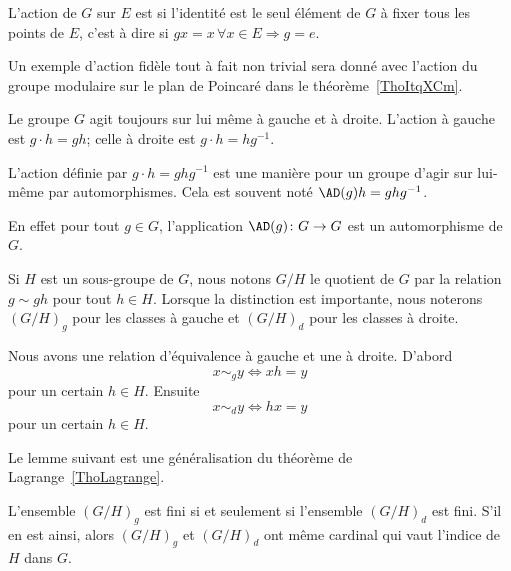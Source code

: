 \begin{definition}  \label{DefuyYJRh}
    L'action de \( G\) sur \( E\) est  si l'identité est le seul élément de \( G\) à fixer tous les points de \( E\), c'est à dire si \( gx=x\,\forall x\in E\Rightarrow g=e\).
\end{definition}

Un exemple d'action fidèle tout à fait non trivial sera donné avec l'action du groupe modulaire sur le plan de Poincaré dans le théorème~\ref{ThoItqXCm}.

Le groupe \( G\) agit toujours sur lui même à gauche et à droite. L'action à gauche est \( g\cdot h=gh\); celle à droite est \( g\cdot h=hg^{-1}\).

\begin{definition}      \label{DEFooCORTooEeOLPT}
    L'action  définie par \( g\cdot h=ghg^{-1}\) est une manière pour un groupe d'agir sur lui-même par automorphismes. Cela est souvent noté \( \AD(g)h=ghg^{-1}\).
\end{definition}
En effet pour tout \( g\in G\), l'application \( \AD(g)\colon G\to G\) est un automorphisme de \( G\).

Si \( H\) est un sous-groupe de  \( G\), nous notons \( G/H\) le quotient de $G$ par la relation \( g\sim gh\) pour tout \( h\in H\). Lorsque la distinction est importante, nous noterons \( (G/H)_g\) pour les classes à gauche et \( (G/H)_d\) pour les classes à droite.

Nous avons une relation d'équivalence à gauche et une à droite. D'abord
\begin{equation}
    x\sim_g y\Leftrightarrow xh=y
\end{equation}
pour un certain \( h\in H\). Ensuite
\begin{equation}
    x\sim_d y\Leftrightarrow hx=y
\end{equation}
pour un certain \( h\in H\).

Le lemme suivant est une généralisation du théorème de Lagrange~\ref{ThoLagrange}.

\begin{lemma}
    L'ensemble \( (G/H)_g\) est fini si et seulement si l'ensemble \( (G/H)_d\) est fini. S'il en est ainsi, alors \( (G/H)_g\) et \( (G/H)_d\) ont même cardinal qui vaut l'indice de \( H\) dans \( G\).
\end{lemma}

